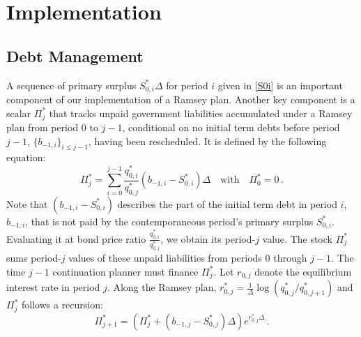 \documentclass[12pt]{article}
\newcommand{\NW}[1]{{\textcolor{blue}{#1}}}
\begin{document}
	
	
	
	
	
	
	\section{Implementation} %
\label{newimple} 

\subsection{Debt Management} \label{sec:activedebt}  %

{A sequence of primary surplus $S_{0, i}^*\Delta$   for period $i$  given in \eqref{S0i} is an important  component of our implementation of  a Ramsey plan.  
Another key component is a scalar   $\Pi_j^*$ that  
tracks   %
unpaid government liabilities %
accumulated under  a Ramsey plan  from period $0$ to $j-1$, conditional on no  initial term debts  before period $j-1$, $\{ b_{-1,i}\}_{i\leq j-1}$, having been rescheduled. It is defined by the following equation:
\begin{equation} \label{Pistar}
\Pi_j^* = \sum_{i=0}^{j-1} \frac{q_{0, i}^*}{q_{0, j}^*} \left(b_{-1, i}-S_{0, i}^*\right)\Delta \quad \text{with} \quad \Pi_0^*= 0\,.
\end{equation} %
Note that  $ \left(b_{-1, i}-S_{0, i}^*\right)$ describes the part of the  initial term debt in period $i$, $b_{-1, i}$, that is not paid by the contemporaneous period's primary surplus $S_{0, i}^*$.} Evaluating it at  bond price ratio $ \frac{q_{0, i}^*}{q_{0, j}^*}$, we obtain its period-$j$ value. {The stock $\Pi_j^*$ sums   period-$j$  values of these unpaid liabilities from periods $0$ through $j-1$. 
The time $j-1$ continuation planner must  finance $\Pi_j^*$. %
Let $r_{0, j}$ denote the equilibrium interest rate in period $j$. Along the Ramsey plan, $r_{0, j}^*=\frac{1}{\Delta}\log(q_{0, j}^*/q_{0, j+1}^*)$ and $\Pi_j^*$ follows a recursion: 
	\begin{equation}\label{dynamicPi}
		\Pi_{j+1}^* = \left(\Pi_j^* +(b_{-1, j}-S_{0, j}^*)\Delta \right)e^{r_{0, j}^*\Delta}\,.
	\end{equation}
}
\end{document}
